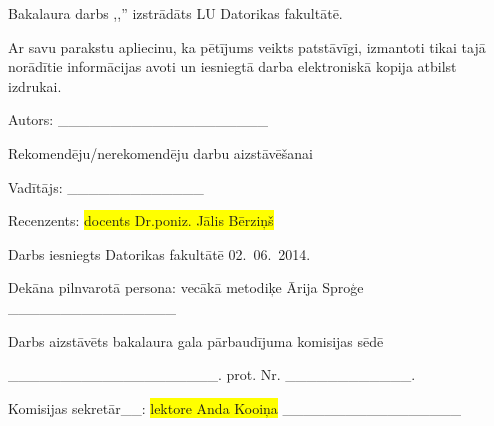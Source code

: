 \newcommand{\makedocpagee}{
		\thispagestyle{empty} 
		Bakalaura darbs ,,\@nosaukums''
		izstrādāts LU Datorikas fakultātē.
		\vspace{1cm} 
		
		Ar savu parakstu apliecinu, ka pētījums veikts patstāvīgi, 
		izmantoti tikai tajā norādītie informācijas avoti un iesniegtā darba elektroniskā kopija atbilst izdrukai.

		Autors: \_\_\_\_\_\_\_\_\_\_\_\_\_\_\_\_\_\_\_\_
		{\@autors}
		\vspace{3cm} 
		
		Rekomendēju/nerekomendēju darbu aizstāvēšanai
		\vspace{1cm} 
		
		
		Vadītājs: {\@vaditajs} 
		\_\_\_\_\_\_\_\_\_\_\_\_\_ {\@datums}
		
		\vspace{2cm} 
		{\raggedright
		Recenzents: \colorbox[HTML]{FFFF00}{docents Dr.poniz. J\={a}lis
		B\={e}rzi\c{n}\v{s}}}

		\vspace{2cm}
		Darbs iesniegts Datorikas fakultātē  02.~06.~2014.

		Dekāna pilnvarotā persona: vecākā metodiķe Ārija Sproģe \_\_\_\_\_\_\_\_\_\_\_\_\_\_\_\_
		\vspace{3cm} 
		
		Darbs aizstāvēts bakalaura gala pārbaudījuma komisijas sēdē

		\vspace{1cm} 
		\_\_\_\_\_\_\_\_\_\_\_\_\_\_\_\_\_\_\_\_. prot. Nr.
		\_\_\_\_\_\_\_\_\_\_\_\_.

		\vspace{1cm} 
		Komisijas sekretār\_\_: \colorbox[HTML]{FFFF00}{lektore Anda
		Kooi\c{n}a} \_\_\_\_\_\_\_\_\_\_\_\_\_\_\_\_\_
}
\makedocpagee

